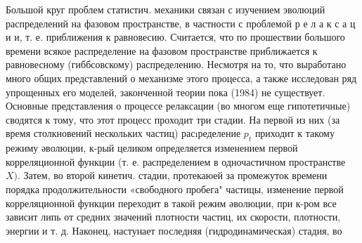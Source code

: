 \documentclass[10pt]{article}
\begin{document}
Большой круг проблем статистич. механики связан с изучением эволюций распределений на фазовом пространстве, в частности с проблемой р е л а к с а ц и и, т. е. приближения к равновесию. Считается, что по прошествии большого времени всякое распределение на фазовом пространстве приближается к равновесному (гиббсовскому) распределению. Несмотря на то, что выработано много общих представлений о механизме этого процесса, а также исследован ряд упрощенных его моделей, законченной теории пока (1984) не существует. Основные представления о процессе релаксации (во многом еще гипотетичные) сводятся к тому, что этот процесс проходит три стадии. На первой из них (за время столкновений нескольких частиц) расıределение $p_{t}$ приходит к такому режиму әволюции, к-рый целиком определяется изменением первой корреляционной функции (т. е. распределением в одночастичном пространстве $X)$. Затем, во второй кинетич. стадии, протекаюей за промежуток времени порядка продолжительности «свободного пробега" частицы, изменение первой корреляционной функции переходит в такой режим әволюции, при к-ром все зависит липь от средних значений плотности частиц, их скорости, плотности, энергии и т. д. Наконец, настунает последняя (гидродинамическая) стадия, во
\end{document}
